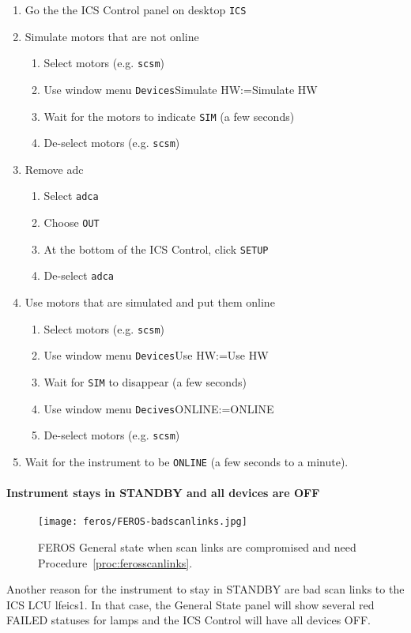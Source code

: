 \documentclass[11pt,fleqn,a4paper]{book}
\makeatletter
\def\menu#1#2{\texttt{#1}\ifx{}#2\else\@for\@x:=#2\do{$\rightarrow$\texttt{\@x}}\fi}
\def\wmenu#1#2{window menu \menu{#1}{#2}}
\makeatother
\begin{document}
\label{proc:ferosadcatstartup}
\begin{enumerate}
    \item Go the the \gls{ICS Control} panel on \gls{desktop} \texttt{ICS}
    \item Simulate motors that are not online
    \begin{enumerate}
         \item Select motors (e.g. \texttt{scsm})
         \item Use \wmenu{Devices}{Simulate HW}
         \item Wait for the motors to indicate \texttt{SIM} (a few seconds)
         \item De-select motors (e.g. \texttt{scsm})
    \end{enumerate}
    \item Remove \gls{adc}
    \begin{enumerate}
        \item Select \texttt{adca}
        \item Choose \texttt{OUT}
        \item At the bottom of the ICS Control, click \texttt{SETUP}
        \item De-select \texttt{adca}
    \end{enumerate}
    \item Use motors that are simulated and put them online
    \begin{enumerate}
         \item Select motors (e.g. \texttt{scsm})
         \item Use \wmenu{Devices}{Use HW}
         \item Wait for \texttt{SIM} to disappear (a few seconds)
         \item Use \wmenu{Decives}{ONLINE}
         \item De-select motors (e.g. \texttt{scsm})
    \end{enumerate}
    \item Wait for the instrument to be \texttt{ONLINE} (a few seconds to a minute).
\end{enumerate}

\paragraph{Instrument stays in STANDBY and all devices are OFF}
\begin{figure}
\centering
\texttt{[image: feros/FEROS-badscanlinks.jpg]}
\caption[When feinsInstallScanLinks is needed]{FEROS General state when scan links are compromised and need Procedure~\ref{proc:ferosscanlinks}.}
\end{figure}
Another reason for the instrument to stay in STANDBY are bad scan links to the ICS LCU \gls{lfeics1}. In that case, the \gls{General State} panel will show several red FAILED statuses for lamps and the \gls{ICS Control} will have all devices OFF.
\end{document}
